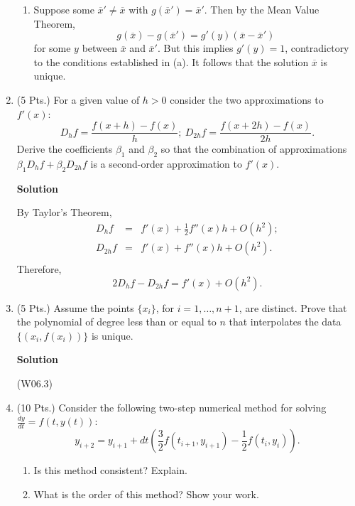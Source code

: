 \documentclass{article}
\begin{document}
\begin{enumerate}
\begin{enumerate}
\item Suppose some \(\overline{x}' \neq \overline{x}\) with \(g(\overline{x}') = \overline{x}'\).  Then by the Mean Value Theorem,
\[g(\overline{x}) - g(\overline{x}') = g'(y) (\overline{x} - \overline{x}')\]
for some \(y\) between \(\overline{x}\) and \(\overline{x}'\).  But this implies \(g'(y) = 1\), contradictory to the conditions established in (a).  It follows that the solution \(\overline{x}\) is unique.

\end{enumerate}



\item (5 Pts.) For a given value of \(h > 0\) consider the two approximations to \(f'(x)\):
\[D_h f = \frac{f(x + h) - f(x)}{h}; \ D_{2h} f = \frac{f(x + 2h) - f(x)}{2h}.\]
Derive the coefficients \(\beta_1\) and \(\beta_2\) so that the combination of approximations \(\beta_1 D_h f + \beta_2 D_{2h} f\) is a second-order approximation to \(f'(x)\).

{\bf Solution}

By Taylor's Theorem,
\begin{eqnarray*}
D_h f & = & f'(x) + \frac{1}{2} f''(x) h + O(h^2); \\
D_{2h} f & = & f'(x) + f''(x) h + O(h^2). \\
\end{eqnarray*}
Therefore,
\[2 D_h f - D_{2h} f = f'(x) + O(h^2).\]



\item (5 Pts.) Assume the points \(\{x_i\}\), for \(i = 1, \ldots, n + 1\), are distinct.  Prove that the polynomial of degree less than or equal to \(n\) that interpolates the data \(\{(x_i, f(x_i))\}\) is unique.

{\bf Solution}

(W06.3)



\item (10 Pts.) Consider the following two-step numerical method for solving \(\frac{dy}{dt} = f(t,y(t))\):
\[y_{i + 2} = y_{i + 1} + dt \left( \frac{3}{2} f(t_{i + 1}, y_{i + 1}) - \frac{1}{2} f(t_i, y_i) \right).\]

\begin{enumerate}
\item Is this method consistent?  Explain.

\item What is the order of this method?  Show your work.


\end{enumerate}
\end{enumerate}
\end{document}
